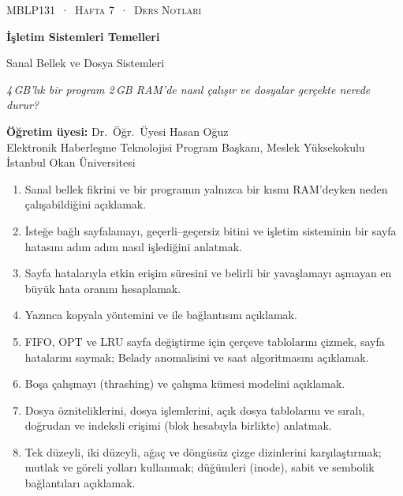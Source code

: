 \thispagestyle{empty}
\begin{tcolorbox}[enhanced,colback=dark,colframe=dark,arc=0pt,boxrule=0pt,
  left=18pt,right=18pt,top=20pt,bottom=20pt,coltext=white]
{\small\color{mint}\textsc{MBLP131 \,·\, Hafta 7 \,·\, Ders Notları}}\par\medskip
{\headfont\fontsize{26}{30}\selectfont\bfseries İşletim Sistemleri Temelleri}\par\medskip
{\large Sanal Bellek ve Dosya Sistemleri}\par\smallskip
{\small\itshape\color{white!70} 4\,GB'lık bir program 2\,GB RAM'de nasıl çalışır ve dosyalar gerçekte nerede durur?}
\end{tcolorbox}

\vspace{0.4em}
\begin{minipage}[t]{0.70\linewidth}
\small
\textbf{Öğretim üyesi:} Dr.\ Öğr.\ Üyesi Hasan Oğuz\\
Elektronik Haberleşme Teknolojisi Program Başkanı, Meslek Yüksekokulu\\
İstanbul Okan Üniversitesi
\end{minipage}

\vspace{0.8em}
\begin{keyidea}
\begin{enumerate}[leftmargin=1.4em]
  \item Sanal bellek fikrini ve bir programın yalnızca bir kısmı RAM'deyken neden çalışabildiğini açıklamak.
  \item İsteğe bağlı sayfalamayı, geçerli--geçersiz bitini ve işletim sisteminin bir sayfa hatasını adım adım nasıl işlediğini anlatmak.
  \item Sayfa hatalarıyla etkin erişim süresini ve belirli bir yavaşlamayı aşmayan en büyük hata oranını hesaplamak.
  \item Yazınca kopyala yöntemini ve  ile bağlantısını açıklamak.
  \item FIFO, OPT ve LRU sayfa değiştirme için çerçeve tablolarını çizmek, sayfa hatalarını saymak; Belady anomalisini ve saat algoritmasını açıklamak.
  \item Boşa çalışmayı (thrashing) ve çalışma kümesi modelini açıklamak.
  \item Dosya özniteliklerini, dosya işlemlerini, açık dosya tablolarını ve sıralı, doğrudan ve indeksli erişimi (blok hesabıyla birlikte) anlatmak.
  \item Tek düzeyli, iki düzeyli, ağaç ve döngüsüz çizge dizinlerini karşılaştırmak; mutlak ve göreli yolları kullanmak; düğümleri (inode), sabit ve sembolik bağlantıları açıklamak.
\end{enumerate}
\end{keyidea}

